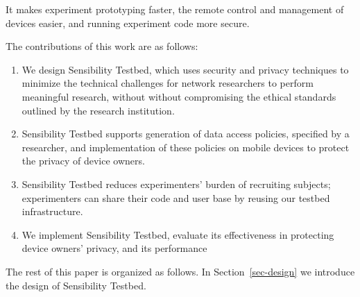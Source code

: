 %
It makes experiment
prototyping faster, the remote control and management of devices
easier, and running experiment code more secure. 

The contributions of this work are as follows:

\begin{enumerate}
\item We design Sensibility Testbed, which uses security and 
privacy techniques to minimize the technical challenges for 
network researchers to perform meaningful research, without 
without compromising the ethical standards outlined by the 
research institution.

\item Sensibility Testbed supports generation of data access 
policies, specified by a researcher, and implementation of 
these policies on mobile devices to protect the privacy of 
device owners.

\item Sensibility Testbed reduces experimenters' burden of 
recruiting subjects; experimenters can share their code and 
user base by reusing our testbed infrastructure.


\item We implement Sensibility Testbed, evaluate its effectiveness
in protecting device owners' privacy, and its performance 
\end{enumerate}

The rest of this paper is organized as follows. In Section~\ref{sec-design}
we introduce the design of Sensibility Testbed.
